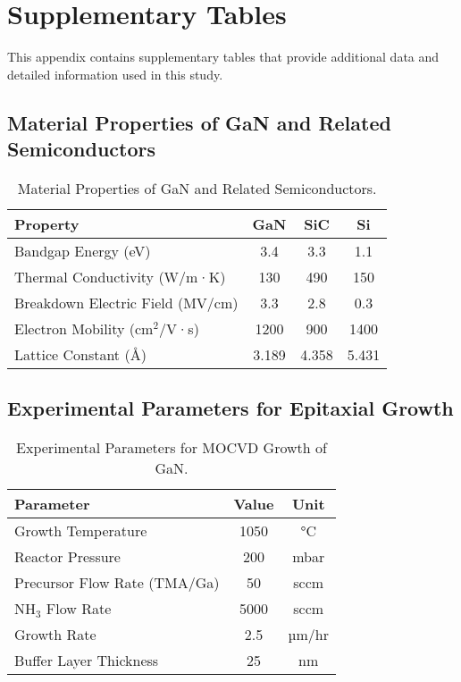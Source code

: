 \chapter{Supplementary Tables}

This appendix contains supplementary tables that provide additional data and detailed information used in this study.

\section{Material Properties of GaN and Related Semiconductors}

\begin{table}[ht!]
\centering
\caption{Material Properties of GaN and Related Semiconductors.}
\label{tab:material_properties}
\begin{tabular}{@{}lccc@{}}
\toprule
\textbf{Property}               & \textbf{GaN} & \textbf{SiC} & \textbf{Si} \\ \midrule
Bandgap Energy (eV)             & 3.4          & 3.3          & 1.1         \\
Thermal Conductivity (W/m·K)    & 130          & 490          & 150         \\
Breakdown Electric Field (MV/cm) & 3.3          & 2.8          & 0.3         \\
Electron Mobility (cm$^2$/V·s)  & 1200         & 900          & 1400        \\
Lattice Constant (Å)            & 3.189        & 4.358        & 5.431       \\ \bottomrule
\end{tabular}
\end{table}

\section{Experimental Parameters for Epitaxial Growth}

\begin{table}[ht!]
\centering
\caption{Experimental Parameters for MOCVD Growth of GaN.}
\label{tab:experimental_parameters}
\begin{tabular}{@{}lcc@{}}
\toprule
\textbf{Parameter}              & \textbf{Value}          & \textbf{Unit}      \\ \midrule
Growth Temperature              & 1050                    & °C                \\
Reactor Pressure                & 200                     & mbar              \\
Precursor Flow Rate (TMA/Ga)    & 50                      & sccm              \\
NH$_3$ Flow Rate                & 5000                    & sccm              \\
Growth Rate                     & 2.5                     & µm/hr             \\
Buffer Layer Thickness          & 25                      & nm                \\ \bottomrule
\end{tabular}
\end{table}

